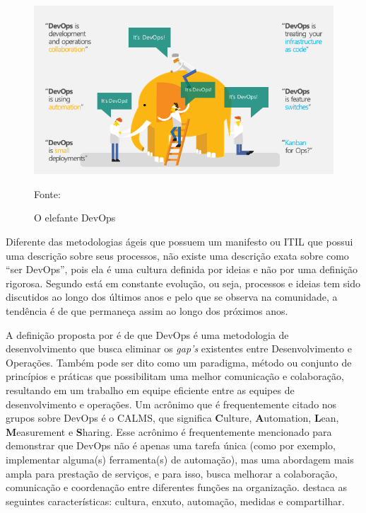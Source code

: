 \documentclass[twoside,english,brazilian]{UNISINOSartigo}
\newcommand{\source}[1]{\caption*{Fonte: {#1}} }
\begin{document}
\begin{figure}[h!]
    \centering
        \caption{O elefante DevOps}
    \includegraphics[scale=.6]{imagens/devops_elephant.png}
    \source{}
    \label{fig:elefante DevOps}
\end{figure}

Diferente das metodologias ágeis que possuem um manifesto ou ITIL que possui uma descrição sobre seus processos, não existe uma descrição exata sobre como ``ser DevOps'', pois ela é uma cultura definida por ideias e não por uma definição rigorosa. Segundo  está em constante evolução, ou seja, processos e ideias tem sido discutidos ao longo dos últimos anos e pelo que se observa na comunidade, a tendência é de que permaneça assim ao longo dos próximos anos. 

A definição proposta por  é de que DevOps é uma metodologia de desenvolvimento que busca eliminar os \textit{gap's} existentes entre Desenvolvimento e Operações. Também pode ser dito como um paradigma, método ou conjunto de princípios e práticas que possibilitam uma melhor comunicação e colaboração, resultando em um trabalho em equipe eficiente entre as equipes de desenvolvimento e operações.
Um acrônimo que é frequentemente citado nos grupos sobre DevOps é o CALMS, que significa \textbf{C}ulture, \textbf{A}utomation, \textbf{L}ean, \textbf{M}easurement e \textbf{S}haring. Esse acrônimo é frequentemente mencionado para demonstrar que DevOps não é apenas uma tarefa única (como por exemplo, implementar alguma(s) ferramenta(s) de automação), mas uma abordagem mais ampla para prestação de serviços, e para isso, busca melhorar a colaboração, comunicação  e coordenação entre diferentes funções na organização.  destaca as seguintes características: cultura, enxuto, automação, medidas e compartilhar.
\end{document}
